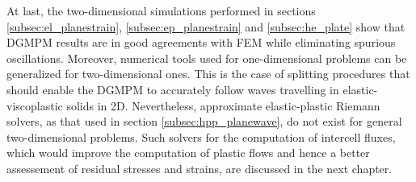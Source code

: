 At last, the two-dimensional simulations performed in sections \ref{subsec:el_planestrain}, \ref{subsec:ep_planestrain} and \ref{subsec:he_plate} show that DGMPM results are in good agreements with FEM while eliminating spurious oscillations.
Moreover, numerical tools used for one-dimensional problems can be generalized for two-dimensional ones. This is the case of splitting procedures that should enable the DGMPM to accurately follow waves travelling in elastic-viscoplastic solids in 2D. Nevertheless, approximate elastic-plastic Riemann solvers, as that used in section \ref{subsec:hpp_planewave}, do not exist for general two-dimensional problems. Such solvers for the computation of intercell fluxes, which would improve the computation of plastic flows and hence a better assessement of residual stresses and strains, are discussed in the next chapter. 


